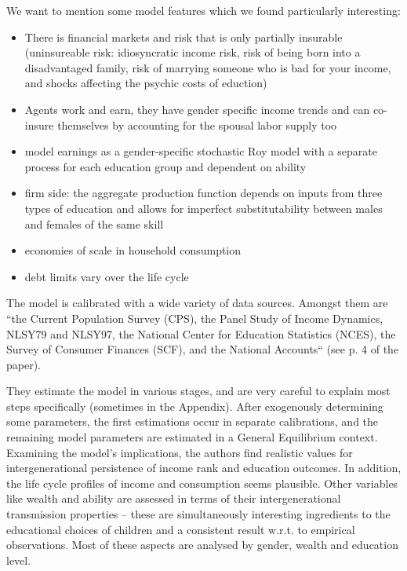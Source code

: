 \documentclass[12pt,a4paper]{article}
\begin{document}
We want to mention some model features which we found particularly interesting:
\begin{itemize}
    \item There is financial markets and risk that is only partially insurable (uninsureable risk: idiosyncratic income risk, risk of being born into a disadvantaged family, risk of marrying someone who is bad for your income, and shocks affecting the psychic costs of eduction)
    \item Agents work and earn, they have gender specific income trends and can co-insure themselves by accounting for the spousal labor supply too
    \item model earnings as a gender-specific stochastic Roy model with a separate process for each education group and dependent on ability
    \item firm side: the aggregate production function depends on inputs from three types of education and allows for imperfect substitutability between males and females of the same skill
    \item economies of scale in household consumption
    \item debt limits vary over the life cycle
\end{itemize}

The model is calibrated with a wide variety of data sources. Amongst them are “the Current Population Survey (CPS), the Panel Study of Income Dynamics, NLSY79 and NLSY97, the National Center for Education Statistics (NCES), the Survey of Consumer Finances (SCF), and the National Accounts“ (see p. 4 of the paper). 

They estimate the model in various stages, and are very careful to explain most steps specifically (sometimes in the Appendix). After exogenously determining some parameters, the first estimations occur in separate calibrations, and the remaining model parameters are estimated in a General Equilibrium context. 
 Examining the model’s implications, the authors find realistic values for intergenerational persistence of income rank and education outcomes. In addition, the life cycle profiles of income and consumption seems plausible. Other variables like wealth and ability are assessed in terms of their intergenerational transmission properties – these are simultaneously interesting ingredients to the educational choices of children and a consistent result w.r.t. to empirical observations. Most of these aspects are analysed by gender, wealth and education level. 
 
\end{document}
